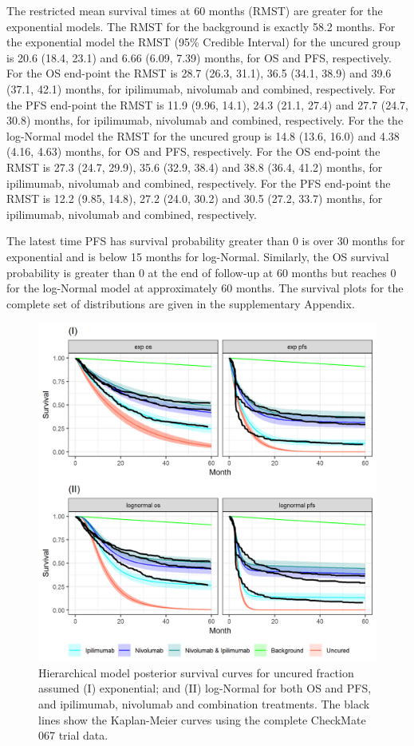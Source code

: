 \documentclass[AMA,STIX1COL]{WileyNJD-v2}
\begin{document}
The restricted mean survival times at 60 months (RMST) are greater for the exponential models.
The RMST for the background is exactly 58.2 months.
For the exponential model the RMST (95\% Credible Interval) for the uncured group is 20.6 (18.4, 23.1) and 6.66 (6.09, 7.39) months, for OS and PFS, respectively. 
For the OS end-point the RMST is 28.7 (26.3, 31.1), 36.5 (34.1, 38.9) and 39.6 (37.1, 42.1) months, for ipilimumab, nivolumab and combined, respectively.
For the PFS end-point the RMST is 11.9 (9.96, 14.1), 24.3 (21.1, 27.4) and 27.7 (24.7, 30.8) months, for ipilimumab, nivolumab and combined, respectively.
For the the log-Normal model the RMST for the uncured group is 14.8 (13.6, 16.0) and 4.38 (4.16, 4.63) months, for OS and PFS, respectively. 
For the OS end-point the RMST is 27.3 (24.7, 29.9), 35.6 (32.9, 38.4) and 38.8 (36.4, 41.2) months, for ipilimumab, nivolumab and combined, respectively.
For the PFS end-point the RMST is 12.2 (9.85, 14.8), 27.2 (24.0, 30.2) and 30.5 (27.2, 33.7) months, for ipilimumab, nivolumab and combined, respectively.

The latest time PFS has survival probability greater than 0 is over 30 months for exponential and is below 15 months for log-Normal.
Similarly, the OS survival probability is greater than 0 at the end of follow-up at 60 months but reaches 0 for the log-Normal model at approximately 60 months.
The survival plots for the complete set of distributions are given in the supplementary Appendix.


\begin{figure}
\centering
\includegraphics[width=0.7\linewidth]{plot_S_exp_lognormal_grid_cf_hier.png}
\caption{\label{fig:S_exp_lnorm_cf_hier} Hierarchical model posterior survival curves for uncured fraction assumed (I) exponential; and (II) log-Normal for both OS and PFS, and ipilimumab, nivolumab and combination treatments. The black lines show the Kaplan-Meier curves using the complete CheckMate 067 trial data.}
\end{figure}
\end{document}
